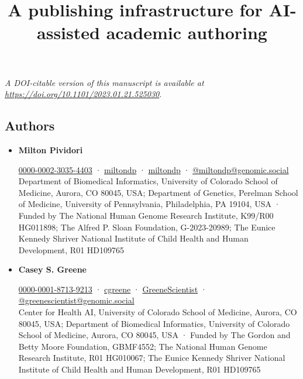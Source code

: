 \documentclass[
]{article}
\title{A publishing infrastructure for AI-assisted academic authoring}
\author{}
\date{}
\begin{document}
\maketitle

\emph{A DOI-citable version of this manuscript is available at \url{https://doi.org/10.1101/2023.01.21.525030}}.

\hypertarget{authors}{%
\subsection{Authors}\label{authors}}

\begin{itemize}
\item
  \textbf{Milton Pividori}
  
  \href{https://orcid.org/0000-0002-3035-4403}{0000-0002-3035-4403}
  · 
  \href{https://github.com/miltondp}{miltondp}
  · 
  \href{https://twitter.com/miltondp}{miltondp}
  · 
  \href{https://genomic.social/@miltondp}{@miltondp@genomic.social} \\
  Department of Biomedical Informatics, University of Colorado School of Medicine, Aurora, CO 80045, USA; Department of Genetics, Perelman School of Medicine, University of Pennsylvania, Philadelphia, PA 19104, USA
  · Funded by The National Human Genome Research Institute, K99/R00 HG011898; The Alfred P. Sloan Foundation, G-2023-20989; The Eunice Kennedy Shriver National Institute of Child Health and Human Development, R01 HD109765
\item
  \textbf{Casey S. Greene}
  \textsuperscript{\protect\hyperlink{correspondence}{\Letter}}
  
  \href{https://orcid.org/0000-0001-8713-9213}{0000-0001-8713-9213}
  · 
  \href{https://github.com/cgreene}{cgreene}
  · 
  \href{https://twitter.com/GreeneScientist}{GreeneScientist}
  · 
  \href{https://genomic.social/@greenescientist}{@greenescientist@genomic.social} \\
  Center for Health AI, University of Colorado School of Medicine, Aurora, CO 80045, USA; Department of Biomedical Informatics, University of Colorado School of Medicine, Aurora, CO 80045, USA
  · Funded by The Gordon and Betty Moore Foundation, GBMF4552; The National Human Genome Research Institute, R01 HG010067; The Eunice Kennedy Shriver National Institute of Child Health and Human Development, R01 HD109765
\end{itemize}
\end{document}
